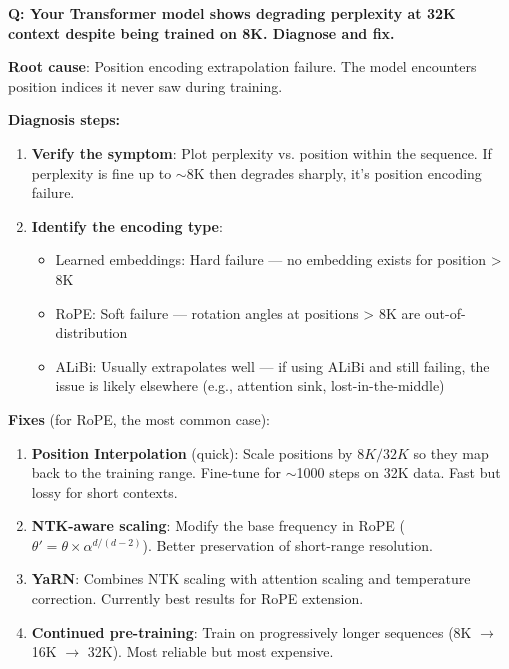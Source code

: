 \begin{interviewq}
\end{interviewq}

\begin{interviewq}
\textbf{Q: Your Transformer model shows degrading perplexity at 32K context despite being trained on 8K. Diagnose and fix.}

 \quad {} \quad \badgefreq{\freqmed}

\stronganswer

\textbf{Root cause}: Position encoding extrapolation failure. The model encounters position indices it never saw during training.

\textbf{Diagnosis steps:}
\begin{enumerate}
    \item \textbf{Verify the symptom}: Plot perplexity vs. position within the sequence. If perplexity is fine up to $\sim$8K then degrades sharply, it's position encoding failure.
    \item \textbf{Identify the encoding type}:
    \begin{itemize}
        \item Learned embeddings: Hard failure --- no embedding exists for position > 8K
        \item RoPE: Soft failure --- rotation angles at positions > 8K are out-of-distribution
        \item ALiBi: Usually extrapolates well --- if using ALiBi and still failing, the issue is likely elsewhere (e.g., attention sink, lost-in-the-middle)
    \end{itemize}
\end{enumerate}

\textbf{Fixes} (for RoPE, the most common case):
\begin{enumerate}
    \item \textbf{Position Interpolation} (quick): Scale positions by $8K/32K$ so they map back to the training range. Fine-tune for $\sim$1000 steps on 32K data. Fast but lossy for short contexts.
    \item \textbf{NTK-aware scaling}: Modify the base frequency in RoPE ($\theta' = \theta \times \alpha^{d/(d-2)}$). Better preservation of short-range resolution.
    \item \textbf{YaRN}: Combines NTK scaling with attention scaling and temperature correction. Currently best results for RoPE extension.
    \item \textbf{Continued pre-training}: Train on progressively longer sequences (8K $\to$ 16K $\to$ 32K). Most reliable but most expensive.
\end{enumerate}


\end{interviewq}

